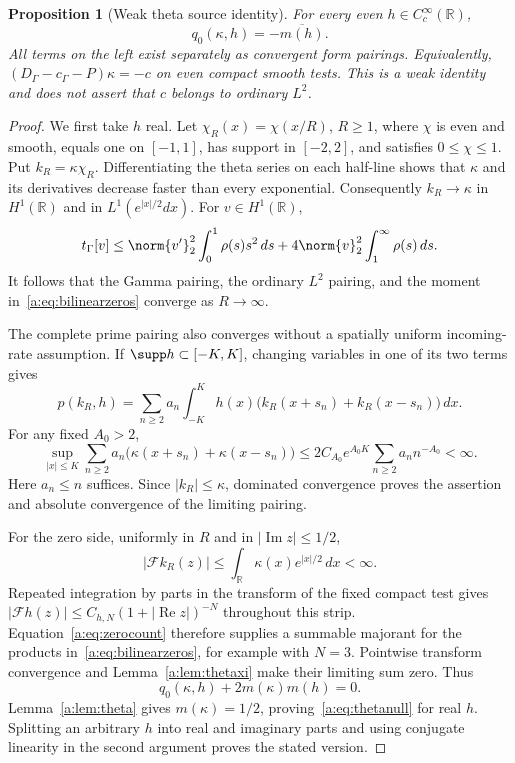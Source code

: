 \documentclass[11pt,a4paper]{article}
\numberwithin{equation}{section}
\newtheorem{proposition}[theorem]{Proposition}
\theoremstyle{definition}\newtheorem{definition}[theorem]{Definition}
\theoremstyle{remark}\newtheorem{remark}[theorem]{Remark}
\newcommand{\R}{\mathbb R}\newcommand{\C}{\mathbb C}\newcommand{\N}{\mathbb N}
\newcommand{\tg}{t_\Gamma}\newcommand{\cg}{c_\Gamma}
\begin{document}
\begin{proposition}[Weak theta source identity]\label{a:prop:thetanull}
For every even $h\in C_c^\infty(\R)$,
\begin{equation}\label{a:eq:thetanull}
 q_0(\kappa,h)=-\overline{m(h)}.
\end{equation}
All terms on the left exist separately as convergent form pairings. Equivalently, $(D_\Gamma-\cg-P)\kappa=-c$ on even compact smooth tests. This is a weak identity and does not assert that $c$ belongs to ordinary $L^2$.
\end{proposition}
\begin{proof}
We first take $h$ real. Let $\chi_R(x)=\chi(x/R)$, $R\ge1$, where $\chi$ is even and smooth, equals one on $[-1,1]$, has support in $[-2,2]$, and satisfies $0\le\chi\le1$. Put $k_R=\kappa\chi_R$. Differentiating the theta series on each half-line shows that $\kappa$ and its derivatives decrease faster than every exponential. Consequently $k_R\to\kappa$ in $H^1(\R)$ and in $L^1(e^{|x|/2}dx)$. For $v\in H^1(\R)$,
\[
 \tg[v]\le\norm{v'}_2^2\int_0^1\rho(s)s^2\,ds
              +4\norm{v}_2^2\int_1^\infty\rho(s)\,ds.
\]
It follows that the Gamma pairing, the ordinary $L^2$ pairing, and the moment in~\eqref{a:eq:bilinearzeros} converge as $R\to\infty$.

The complete prime pairing also converges without a spatially uniform incoming-rate assumption. If $\supp h\subset[-K,K]$, changing variables in one of its two terms gives
\[
 p(k_R,h)=\sum_{n\ge2}a_n\int_{-K}^K h(x)
           \bigl(k_R(x+s_n)+k_R(x-s_n)\bigr)\,dx.
\]
For any fixed $A_0>2$,
\begin{equation}\label{a:eq:bridgeprimerate}
 \sup_{|x|\le K}\sum_{n\ge2}a_n
       \bigl(\kappa(x+s_n)+\kappa(x-s_n)\bigr)
 \le2C_{A_0}e^{A_0K}\sum_{n\ge2}a_nn^{-A_0}<\infty.
\end{equation}
Here $a_n\le n$ suffices. Since $|k_R|\le\kappa$, dominated convergence proves the assertion and absolute convergence of the limiting pairing.

For the zero side, uniformly in $R$ and in $|\operatorname{Im}z|\le1/2$,
\[
 |\mathcal Fk_R(z)|\le\int_\R\kappa(x)e^{|x|/2}\,dx<\infty.
\]
Repeated integration by parts in the transform of the fixed compact test gives
$|\mathcal Fh(z)|\le C_{h,N}(1+|\operatorname{Re}z|)^{-N}$ throughout this strip. Equation~\eqref{a:eq:zerocount} therefore supplies a summable majorant for the products in~\eqref{a:eq:bilinearzeros}, for example with $N=3$. Pointwise transform convergence and Lemma~\ref{a:lem:thetaxi} make their limiting sum zero. Thus
\[
 q_0(\kappa,h)+2m(\kappa)m(h)=0.
\]
Lemma~\ref{a:lem:theta} gives $m(\kappa)=1/2$, proving~\eqref{a:eq:thetanull} for real $h$. Splitting an arbitrary $h$ into real and imaginary parts and using conjugate linearity in the second argument proves the stated version.
\end{proof}
\end{document}
